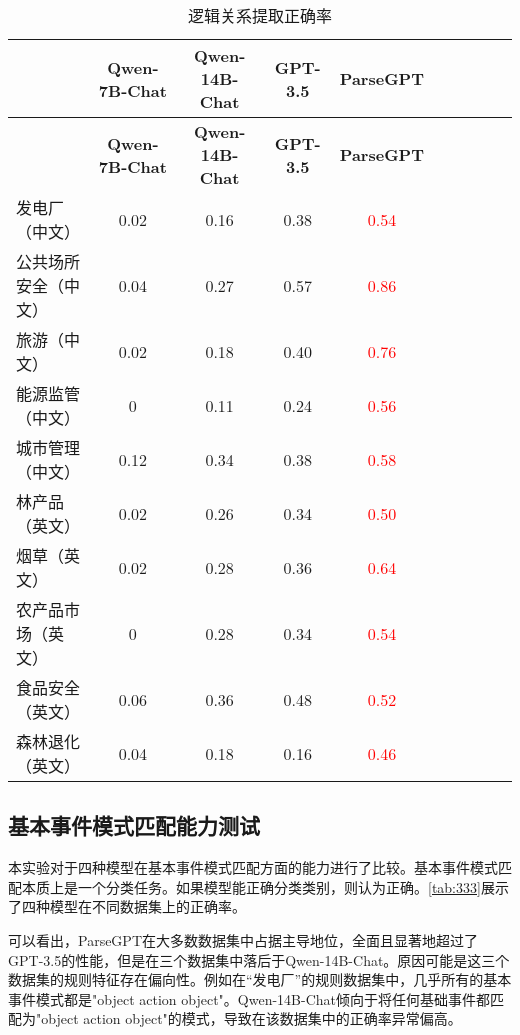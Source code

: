 \begin{longtable}{@{}lccccccccc@{}}
    \caption{逻辑关系提取正确率} \label{tab:222} \\
    \toprule
     & \textbf{Qwen-7B-Chat} & \textbf{Qwen-14B-Chat} & \textbf{GPT-3.5} & \textbf{ParseGPT} \\ 
    \midrule
    \endfirsthead
    
    \toprule
     & \textbf{Qwen-7B-Chat} & \textbf{Qwen-14B-Chat} & \textbf{GPT-3.5} & \textbf{ParseGPT} \\ 
    \midrule
    \endhead
    
    \midrule
    \endfoot
    
    \bottomrule
    \endlastfoot
    
    发电厂（中文） & 0.02 & 0.16 & 0.38 & \textcolor{red}{0.54} \\
    公共场所安全（中文） & 0.04 & 0.27 & 0.57 & \textcolor{red}{0.86} \\
    旅游（中文） & 0.02 & 0.18 & 0.40 & \textcolor{red}{0.76} \\
    能源监管（中文） & 0 & 0.11 & 0.24 & \textcolor{red}{0.56} \\
    城市管理（中文） & 0.12 & 0.34 & 0.38 & \textcolor{red}{0.58} \\
    林产品（英文） & 0.02 & 0.26 & 0.34 & \textcolor{red}{0.50} \\
    烟草（英文） & 0.02 & 0.28 & 0.36 & \textcolor{red}{0.64} \\
    农产品市场（英文） & 0 & 0.28 & 0.34 & \textcolor{red}{0.54} \\
    食品安全（英文） & 0.06 & 0.36 & 0.48 & \textcolor{red}{0.52} \\
    森林退化（英文） & 0.04 & 0.18 & 0.16 & \textcolor{red}{0.46} \\
    
\end{longtable}

\subsection{基本事件模式匹配能力测试}

本实验对于四种模型在基本事件模式匹配方面的能力进行了比较。基本事件模式匹配本质上是一个分类任务。如果模型能正确分类类别，则认为正确。\autoref{tab:333}展示了四种模型在不同数据集上的正确率。

可以看出，ParseGPT在大多数数据集中占据主导地位，全面且显著地超过了GPT-3.5的性能，但是在三个数据集中落后于Qwen-14B-Chat。原因可能是这三个数据集的规则特征存在偏向性。例如在“发电厂”的规则数据集中，几乎所有的基本事件模式都是"object action object"。Qwen-14B-Chat倾向于将任何基础事件都匹配为"object action object"的模式，导致在该数据集中的正确率异常偏高。


